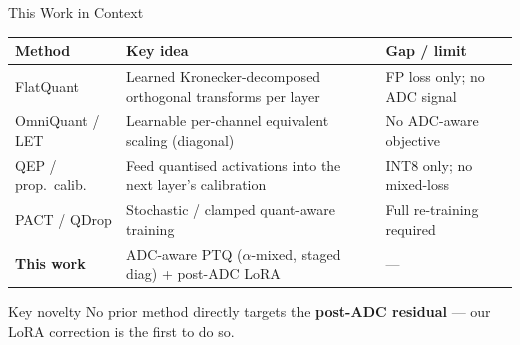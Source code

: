 \begin{frame}[shrink=30]{This Work in Context}
  \begin{center}
  \renewcommand{\arraystretch}{1.15}
  \begin{tabularx}{\textwidth}{lXp{3.3cm}}
    \toprule
    \textbf{Method} & \textbf{Key idea} & \textbf{Gap / limit} \\
    \midrule
    FlatQuant
      & Learned Kronecker-decomposed orthogonal transforms per layer
      & FP loss only; no ADC signal \\
    OmniQuant / LET
      & Learnable per-channel equivalent scaling (diagonal)
      & No ADC-aware objective \\
    QEP / prop.\ calib.
      & Feed quantised activations into the next layer's calibration
      & INT8 only; no mixed-loss \\
    PACT / QDrop
      & Stochastic / clamped quant-aware training
      & Full re-training required \\
    \midrule
    \textbf{This work}
      & ADC-aware PTQ ($\alpha$-mixed, staged diag) + post-ADC LoRA
      & — \\
    \bottomrule
  \end{tabularx}
  \end{center}

  \vspace{0.3em}
  \begin{exampleblock}{Key novelty}
    \small No prior method directly targets the \textbf{post-ADC residual} — our LoRA correction is the first to do so.
  \end{exampleblock}
\end{frame}
